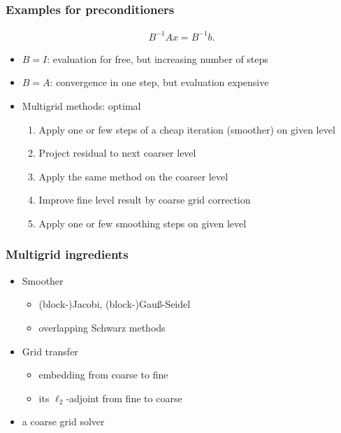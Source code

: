 \begin{frame}
  \frametitle{Examples for preconditioners}
  \begin{gather*}
    B^{-1}Ax = B^{-1}b.
  \end{gather*}
  \begin{itemize}
  \item $B=I$: evaluation for free, but increasing number of steps
  \item $B=A$: convergence in one step, but evaluation expensive
    \pause
  \item Multigrid methods: optimal
    \begin{enumerate}
    \item Apply one or few steps of a cheap iteration (smoother) on given level
    \item Project residual to next coarser level
    \item Apply the same method on the coarser level
    \item Improve fine level result by coarse grid correction
    \item Apply one or few smoothing steps on given level
    \end{enumerate}
  \end{itemize}
\end{frame}

\begin{frame}
  \frametitle{Multigrid ingredients}
  \begin{itemize}
  \item Smoother
    \begin{itemize}
    \item (block-)Jacobi, (block-)Gauß-Seidel
    \item overlapping Schwarz methods
    \end{itemize}
  \item Grid transfer
    \begin{itemize}
    \item embedding from coarse to fine
    \item its $\ell_2$-adjoint from fine to coarse
    \end{itemize}
  \item a coarse grid solver
  \end{itemize}
\end{frame}

